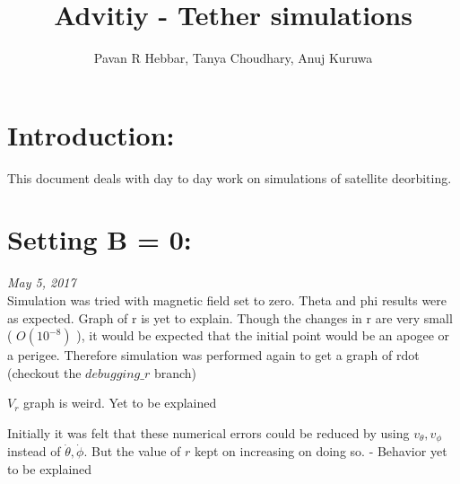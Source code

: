 \documentclass[11pt, a4paper]{article}
\title{\textbf{Advitiy - Tether simulations}}
\author{Pavan R Hebbar, Tanya Choudhary, Anuj Kuruwa}
\begin{document}
\maketitle
\newpage
\tableofcontents
\newpage
\section{Introduction:}
This document deals with day to day work on simulations of satellite deorbiting.

\section{Setting B = 0:}
\emph{May 5, 2017} \\

Simulation was tried with magnetic field set to zero. Theta and phi results were as expected. Graph of r is yet to explain. 
Though the changes in r are very small ( $O(10^{-8})$ ), it would be expected that the initial point would be an apogee or a 
perigee. Therefore simulation was performed again to get a graph of rdot (checkout the $debugging\_r$ branch)

$V_r$ graph is weird. Yet to be explained

Initially it was felt that these numerical errors could be reduced by using $v_{\theta}, v_{\phi}$ instead of $\dot{\theta}, 
\dot{\phi}$. But the value of $r$ kept on increasing on doing so. - Behavior yet to be explained
\end{document}
